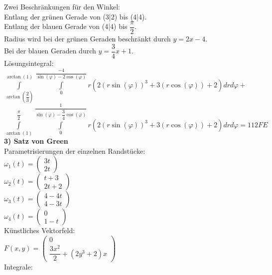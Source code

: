 \documentclass[11pt,final]{scrreprt}
\begin{document}
Zwei Beschränkungen für den Winkel:\\
Entlang der grünen Gerade von (3|2) bis (4|4).\\
Entlang der blauen Gerade von (4|4) bis $\dfrac{\pi}{2}$.\\

Radius wird bei der grünen Geraden beschränkt durch $ y = 2x-4 $.\\
Bei der blauen Geraden durch $ y = \dfrac{3}{4}x+1 $.\\

Lösungsintegral:\\
$ \int\limits_{\arctan(\dfrac{2}{3})}^{\arctan(1)}\int\limits_0^{\dfrac{-4}{\sin(\varphi)-2\cos(\varphi)}} r(2(r\sin(\varphi))^3+3(r\cos(\varphi))+2) drd\varphi + $\\ $ \int\limits_{\arctan(1)}^{\dfrac{\pi}{2}}\int\limits_0^{\dfrac{1}{\sin(\varphi)-\dfrac{3}{4}\cos(\varphi)}} r(2(r\sin(\varphi))^3+3(r\cos(\varphi))+2) drd\varphi = 112FE$\\

\textbf{3) Satz von Green}\\

Parametrisierungen der einzelnen Randstücke:\\
$\omega_1(t) = \left( \begin{matrix}
3t\\2t
\end{matrix}\right)$\\
$\omega_2(t) = \left( \begin{matrix}
t+3\\2t+2
\end{matrix}\right)$\\
$\omega_3(t) = \left( \begin{matrix}
4-4t\\4-3t
\end{matrix}\right)$\\
$\omega_4(t) = \left( \begin{matrix}
0\\1-t
\end{matrix}\right)$\\

Künstliches Vektorfeld:\\
$F(x, y) = \left( \begin{matrix}
0\\\dfrac{3x^2}{2}+(2y^3+2)x
\end{matrix}\right)$\\

Integrale:\\
\end{document}
